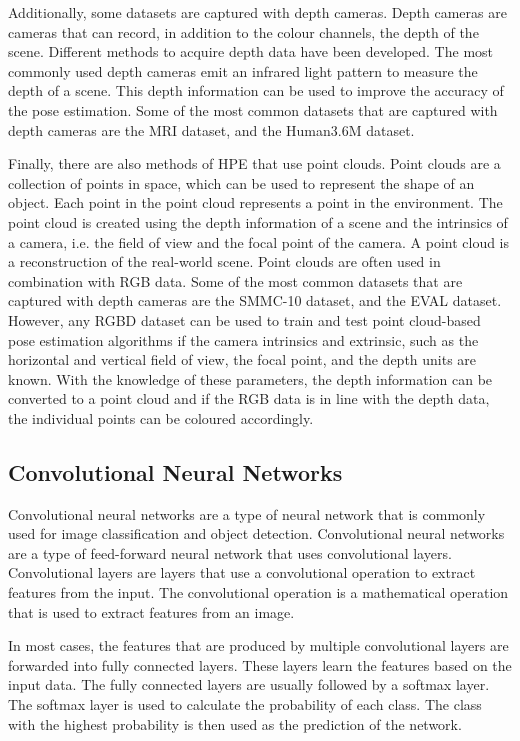 Additionally, some datasets are captured with depth cameras. Depth cameras are cameras that can record, in addition to the colour channels, the depth of the scene. Different methods to acquire depth data have been developed. The most commonly used depth cameras emit an infrared light pattern to measure the depth of a scene. This depth information can be used to improve the accuracy of the pose estimation. Some of the most common datasets that are captured with depth cameras are the MRI dataset\cite{mRI}, and the Human3.6M dataset\cite{h36m_pami}.

Finally, there are also methods of HPE that use point clouds. Point clouds are a collection of points in space, which can be used to represent the shape of an object. Each point in the point cloud represents a point in the environment. The point cloud is created using the depth information of a scene and the intrinsics of a camera, i.e. the field of view and the focal point of the camera. A point cloud is a reconstruction of the real-world scene. Point clouds are often used in combination with RGB data. Some of the most common datasets that are captured with depth cameras are the SMMC-10 dataset\cite{SMMC10}, and the EVAL dataset\cite{EVAL}. However, any RGBD dataset can be used to train and test point cloud-based pose estimation algorithms if the camera intrinsics and extrinsic, such as the horizontal and vertical field of view, the focal point, and the depth units are known. With the knowledge of these parameters, the depth information can be converted to a point cloud and if the RGB data is in line with the depth data, the individual points can be coloured accordingly.

\subsection{Convolutional Neural Networks}

Convolutional neural networks are a type of neural network that is commonly used for image classification and object detection. Convolutional neural networks are a type of feed-forward neural network that uses convolutional layers. Convolutional layers are layers that use a convolutional operation to extract features from the input. The convolutional operation is a mathematical operation that is used to extract features from an image. 

In most cases, the features that are produced by multiple convolutional layers are forwarded into fully connected layers. These layers learn the features based on the input data. The fully connected layers are usually followed by a softmax layer. The softmax layer is used to calculate the probability of each class. The class with the highest probability is then used as the prediction of the network.

